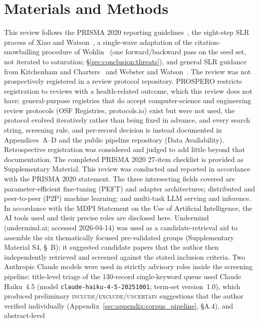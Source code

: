 \section{Materials and Methods}
\label{sec:methodology}

This review follows the PRISMA 2020 reporting guidelines~\cite{Page2021}, the
eight-step SLR process of Xiao and Watson~\cite{XiaoWatson2019}, a single-wave
adaptation of the citation-snowballing procedure of
Wohlin~\cite{Wohlin2014} (one forward/backward pass on the seed set, not iterated
to saturation; \S\ref{sec:conclusion:threats}), and general
SLR guidance from Kitchenham and Charters~\cite{KitchenhamCharters2007} and
Webster and Watson~\cite{Webster2002}. The review was
not prospectively registered in a review protocol repository. PROSPERO
restricts registration to reviews with a health-related outcome, which this
review does not have; general-purpose registries that do accept
computer-science and engineering review protocols (OSF Registries,
protocols.io) exist but were not used, the protocol evolved iteratively
rather than being fixed in advance, and every search string, screening rule,
and per-record decision is instead documented in Appendices~A--D and the
public pipeline repository (Data Availability). Retrospective registration was
considered and judged to add little beyond that documentation. The completed
PRISMA 2020 27-item checklist is provided as Supplementary Material. This
review was conducted and reported in accordance with the PRISMA 2020 statement.
The three intersecting fields covered are parameter-efficient fine-tuning (PEFT) and
adapter architectures; distributed and peer-to-peer (P2P) machine learning;
and multi-task LLM serving and inference. In accordance with the MDPI
Statement on the Use of Artificial Intelligence, the AI tools used and their
precise roles are disclosed here. Undermind (undermind.ai; accessed
2026-04-14) was used as a candidate-retrieval aid to assemble the six
thematically focused pre-validated groups (Supplementary Material S4, \S~B); it
suggested candidate papers that the author then independently retrieved and
screened against the stated inclusion criteria. Two Anthropic Claude models
were used in strictly advisory roles inside the screening pipeline:
title-level triage of the 130-record single-keyword queue used Claude
Haiku~4.5 (model \texttt{claude-haiku-4-5-20251001}; term-set version~1.0),
which produced preliminary \textsc{include}/\textsc{exclude}/\textsc{uncertain}
suggestions that the author verified individually
(Appendix~\ref{sec:appendix:corpus_pipeline}, \S A.4), and abstract-level
